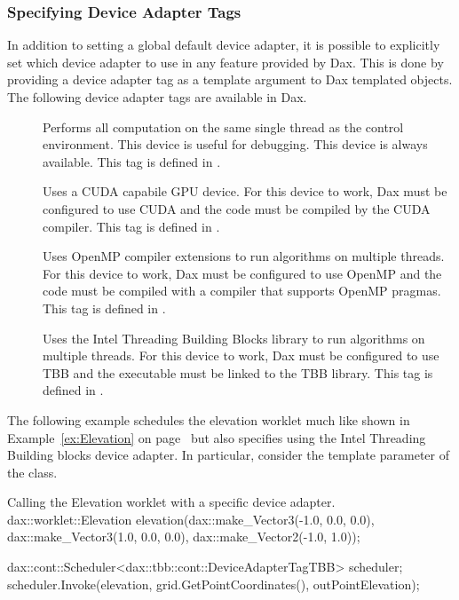 \subsubsection{Specifying Device Adapter Tags}

In addition to setting a global default device adapter, it is possible to
explicitly set which device adapter to use in any feature provided by
Dax. This is done by providing a device adapter tag as a template argument
to Dax templated objects. The following device adapter tags are available
in Dax.

\begin{description}
\item[]  Performs all
  computation on the same single thread as the control environment. This
  device is useful for debugging. This device is always available. This tag
  is defined in .
\item[]  Uses a CUDA capabile
  GPU device. For this device to work, Dax must be configured to use CUDA
  and the code must be compiled by the CUDA 
  compiler. This tag is defined in
  .
\item[]  Uses OpenMP
  compiler extensions to run algorithms on multiple threads. For this
  device to work, Dax must be configured to use OpenMP and the code must be
  compiled with a compiler that supports OpenMP pragmas. This tag is
  defined in .
\item[]
    Uses the Intel
  Threading Building Blocks library to run algorithms on multiple
  threads. For this device to work, Dax must be configured to use TBB and
  the executable must be linked to the TBB library. This tag is defined in
  .
\end{description}

The following example schedules the elevation worklet much like shown in
Example~\ref{ex:Elevation} on page~\pageref{ex:Elevation} but also
specifies using the Intel Threading Building blocks device adapter.
 
In particular, consider the template parameter of the 
class.
\begin{daxexample}{Calling the Elevation worklet with a specific device adapter.}
dax::worklet::Elevation elevation(dax::make_Vector3(-1.0, 0.0, 0.0),
                                  dax::make_Vector3(1.0, 0.0, 0.0),
                                  dax::make_Vector2(-1.0, 1.0));

dax::cont::Scheduler<dax::tbb::cont::DeviceAdapterTagTBB> scheduler;
scheduler.Invoke(elevation, grid.GetPointCoordinates(), outPointElevation);
\end{daxexample}

